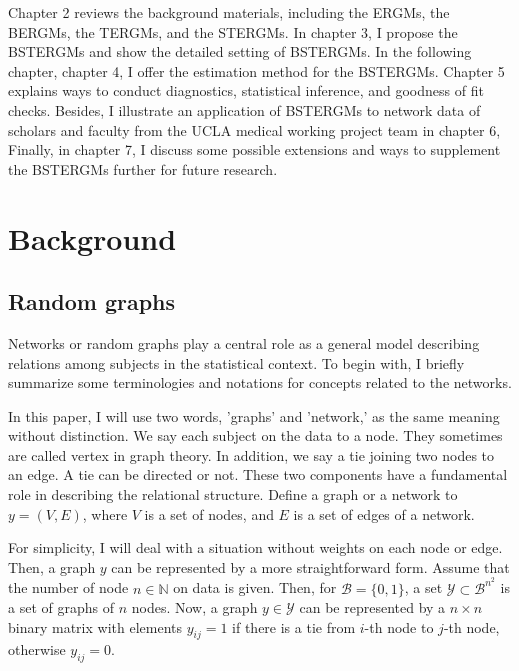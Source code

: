\documentclass[a4paper, 11pt]{report}
\theoremstyle{definition}
\begin{document}
Chapter 2 reviews the background materials, including the ERGMs, the BERGMs, the TERGMs, and the STERGMs. 
In chapter 3, I propose the BSTERGMs and show the detailed setting of BSTERGMs. 
In the following chapter, chapter 4, I offer the estimation method for the BSTERGMs. 
Chapter 5 explains ways to conduct diagnostics, statistical inference, and goodness of fit checks. 
Besides, I illustrate an application of BSTERGMs to network data of scholars and faculty
from the UCLA medical working project team in chapter 6, 
Finally, in chapter 7, I discuss some possible extensions and ways to supplement the BSTERGMs further for future research.



\chapter{Background} \label{Chapter2}
\section{Random graphs}
Networks or random graphs play a central role as a general model 
describing relations among subjects in the statistical context. 
To begin with, I briefly summarize some terminologies and notations for concepts related to the networks.

In this paper, I will use two words, 'graphs' and 'network,' as the same meaning without distinction.
We say each subject on the data to a node. 
They sometimes are called vertex in graph theory. 
In addition, we say a tie joining two nodes to an edge. A tie can be directed or not. 
These two components have a fundamental role in describing the relational structure. 
Define a graph or a network to $y=(V,E)$, where $V$ is a set of nodes, and $E$ is a set of edges of a network.

For simplicity, I will deal with a situation without weights on each node or edge.
Then, a graph $y$ can be represented by a more straightforward form.
Assume that the number of node $n\in \mathbb{N}$ on data is given.
Then, for $\mathcal{B}=\{0,1\}$,
a set $\mathcal{Y} \subset \mathcal{B}^{n^2}$ is a set of graphs of $n$ nodes.
Now, a graph $y \in \mathcal{Y}$ can be represented by a $n \times n$ binary matrix
with elements $y_{ij}=1$ if there is a tie from $i$-th node to $j$-th node,
otherwise $y_{ij}=0$.
\end{document}
